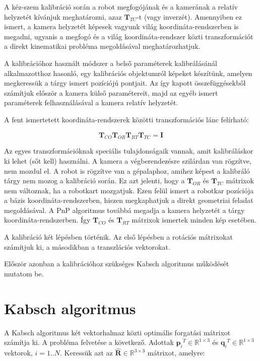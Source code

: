 	A kéz-szem kalibráció során a robot megfogójának és a kamerának a relatív helyzetét kívánjuk meghatározni, azaz $\mathbf{T}_{TC}$-t (vagy inverzét). Amennyiben ez ismert, a kamera helyzetét képesek vagyunk világ koordináta-rendszerben is megadni, ugyanis a megfogó és a világ koordináta-rendszer közti transzformációt a direkt kinematikai probléma megoldásával meghatározhatjuk.

	A kalibrációhoz használt módszer a belső paraméterek kalibrálásánál alkalmazotthoz hasonló, egy kalibrációs objektumról képeket készítünk, amelyen megkeressük a tárgy ismert pozíciójú pontjait. Az így kapott összefüggésekből számítjuk először a kamera külső paramétereit, majd az egyéb ismert paraméterek felhasználásával a kamera relatív helyzetét.	
	
	A fent ismertetett koordináta-rendszerek közötti transzformációs lánc felírható:
	
	\begin{equation}\label{eq:trf-lanc1}
	\mathbf{T}_{CO}\mathbf{T}_{OR}\mathbf{T}_{RT}\mathbf{T}_{TC} = \mathbf{I}
	\end{equation}
	
	Az egyes transzformációknak speciális tulajdonságaik vannak, amit kalibráláskor ki lehet (sőt kell) használni. A kamera a végberendezésre szilárdan van rögzítve, nem mozdul el. A robot is rögzítve van a gépalaphoz, amihez képest a kalibráló tárgy nem mozog a kalibráció során. Ez azt jelenti, hogy a $\mathbf{T}_{OR}$ és $\mathbf{T}_{TC}$ mátrixok nem változnak, ha a robotkart mozgatjuk. Ezen felül ismert a robotkar pozíciója a bázis koordináta-rendszerben, hiszen megkaphatjuk a direkt geometriai feladat megoldásával. A PnP algoritmus továbbá megadja a kamera helyzetét a tárgy koordináta-rendszerben. Így $\mathbf{T}_{CO}$ és $\mathbf{T}_{RT}$ mátrixok ismertek minden kép esetében.
	
	A kalibráció két lépésben történik. Az első lépésben a rotációs mátrixokat számítjuk ki, a másodikban a transzlációs vektorokat.
	
	Először azonban a kalibrációhoz szükséges Kabsch algoritmus működését mutatom be.
	
	\section{Kabsch algoritmus}	

	A Kabsch algoritmus \cite{Kabsch} két vektorhalmaz közti optimális forgatási mátrixot számítja ki. A probléma felvetése a következő. Adottak ${\mathbf{p}_i}^T \in \mathbb{R}^{1 \times 3}$ és ${\mathbf{q}_i}^T \in \mathbb{R}^{1 \times 3}$ vektorok, $i=1..N$. Keressük azt az $\hat{\mathbf{R}} \in \mathbb{R}^{3 \times 3}$ mátrixot, amelyre:
	
